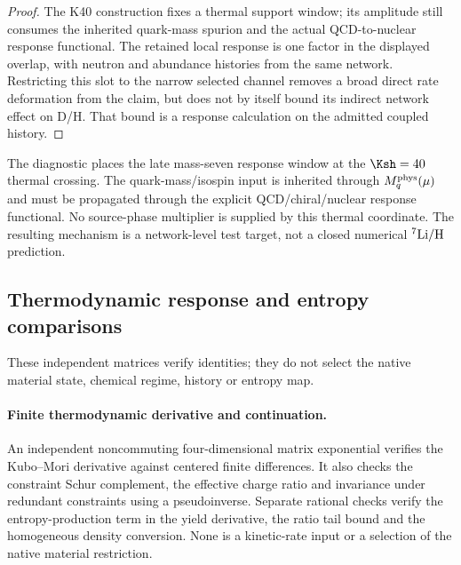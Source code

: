 \documentclass[12pt,a4paper]{article}
\begin{document}
\begin{proof}
The K40 construction fixes a thermal support window; its amplitude
still consumes the inherited quark-mass spurion and the actual QCD-to-nuclear
response functional.  The retained local response is one factor in the
displayed overlap, with neutron and abundance histories from the same network.
Restricting this slot to the narrow selected channel removes a broad direct
rate deformation from the claim, but does not by itself bound its indirect
network effect on D/H.  That bound is a response calculation on the admitted
coupled history.
\end{proof}

The diagnostic places the late mass-seven response window at the \(\Ksh=40\) thermal crossing.  The quark-mass/isospin input is inherited through \(M_q^{\rm phys}(\mu)\) and must be propagated through the explicit QCD/chiral/nuclear response functional.  No source-phase multiplier is supplied by this thermal coordinate.  The resulting mechanism is a network-level test target, not a closed numerical \({}^7{\rm Li}/{\rm H}\) prediction.





\subsection{Thermodynamic response and entropy comparisons}
\label{p9:v2171:app:thermodynamicchecks}
These independent matrices verify identities; they do not select the
native material state, chemical regime, history or entropy map.
\paragraph{Finite thermodynamic derivative and continuation.}
An independent noncommuting four-dimensional matrix exponential verifies
the Kubo--Mori derivative against centered finite differences. It also
checks the constraint Schur complement, the effective charge ratio and
invariance under redundant constraints using a pseudoinverse. Separate
rational checks verify the entropy-production term in the yield derivative,
the ratio tail bound and the homogeneous density conversion. None is a
kinetic-rate input or a selection of the native material restriction.
\end{document}
